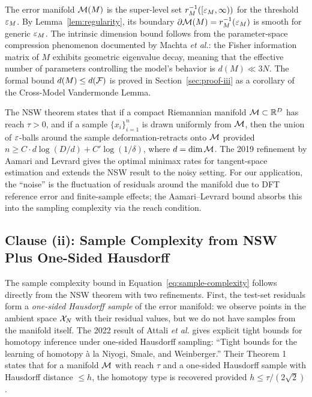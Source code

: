 The error manifold $\mathcal{M}(M)$ is the super-level set $r_M^{-1}([\varepsilon_M, \infty))$ for the threshold $\varepsilon_M$. By Lemma~\ref{lem:regularity}, its boundary $\partial \mathcal{M}(M) = r_M^{-1}(\varepsilon_M)$ is smooth for generic $\varepsilon_M$. The intrinsic dimension bound follows from the parameter-space compression phenomenon documented by Machta \emph{et al.}\cite{machta2013parameter}: the Fisher information matrix of $M$ exhibits geometric eigenvalue decay, meaning that the effective number of parameters controlling the model's behavior is $d(M) \ll 3N$. The formal bound $d(M) \leq d(\mathcal{F})$ is proved in Section~\ref{sec:proof-iii} as a corollary of the Cross-Model Vandermonde Lemma.

The NSW theorem\cite{niyogi2008finding} states that if a compact Riemannian manifold $\mathcal{M} \subset \mathbb{R}^D$ has reach $\tau > 0$, and if a sample $\{x_i\}_{i=1}^n$ is drawn uniformly from $\mathcal{M}$, then the union of $\varepsilon$-balls around the sample deformation-retracts onto $\mathcal{M}$ provided $n \geq C \cdot d \log(D/d) + C' \log(1/\delta)$, where $d = \dim \mathcal{M}$. The 2019 refinement by Aamari and Levrard\cite{aamari2019nonasymptotic} gives the optimal minimax rates for tangent-space estimation and extends the NSW result to the noisy setting. For our application, the ``noise'' is the fluctuation of residuals around the manifold due to DFT reference error and finite-sample effects; the Aamari--Levrard bound absorbs this into the sampling complexity via the reach condition.

\subsection{Clause (ii): Sample Complexity from NSW Plus One-Sided Hausdorff}
\label{sec:proof-ii}

The sample complexity bound in Equation~\eqref{eq:sample-complexity} follows directly from the NSW theorem with two refinements. First, the test-set residuals form a \emph{one-sided Hausdorff sample} of the error manifold: we observe points in the ambient space $\mathcal{X}_N$ with their residual values, but we do not have samples from the manifold itself. The 2022 result of Attali \emph{et al.}\cite{attali2022tight} gives explicit tight bounds for homotopy inference under one-sided Hausdorff sampling: ``Tight bounds for the learning of homotopy \`a la Niyogi, Smale, and Weinberger.'' Their Theorem 1 states that for a manifold $\mathcal{M}$ with reach $\tau$ and a one-sided Hausdorff sample with Hausdorff distance $\leq h$, the homotopy type is recovered provided $h \leq \tau / (2\sqrt{2})$.

